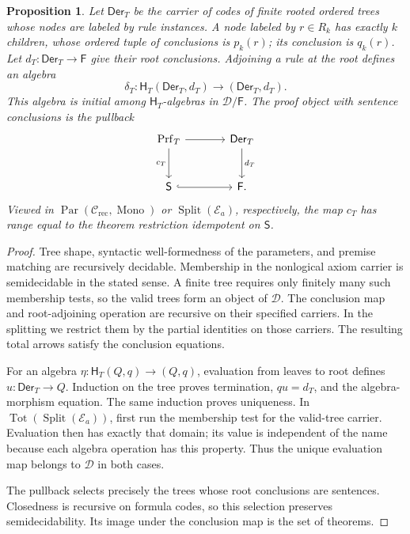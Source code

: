 \documentclass[11pt]{article}
\newtheorem{proposition}[theorem]{Proposition}
\begin{document}
\begin{proposition}\label{prop:first-order-proof-initial}
Let $\mathsf{Der}_T$ be the carrier of codes of finite rooted ordered
trees whose nodes are labeled by rule instances. A node labeled by
$r\in R_k$ has exactly $k$ children, whose ordered tuple of conclusions
is $p_k(r)$; its conclusion is $q_k(r)$. Let
$d_T:\mathsf{Der}_T\to\mathsf F$ give their root conclusions.
Adjoining a rule at the root defines an algebra
\[
 \delta_T:\mathsf H_T(\mathsf{Der}_T,d_T)
       \longrightarrow(\mathsf{Der}_T,d_T).
\]
This algebra is initial among $\mathsf H_T$-algebras in
$\mathcal D/\mathsf F$.
The proof object with sentence conclusions is the pullback
\[
\begin{tikzcd}[column sep=large,row sep=large]
 \mathrm{Prf}_T \arrow[r] \arrow[d,"c_T"'] &
 \mathsf{Der}_T \arrow[d,"d_T"] \\
 \mathsf S \arrow[r,hook] & \mathsf F.
\end{tikzcd}
\]
Viewed in $\operatorname{Par}(\mathcal C_{\mathrm{rec}},\operatorname{Mono})$
or $\operatorname{Split}(\mathcal E_a)$, respectively, the map $c_T$
has range equal to the theorem restriction idempotent on $\mathsf S$.
\end{proposition}
\begin{proof}
Tree shape, syntactic well-formedness of the parameters, and premise
matching are recursively decidable. Membership in the nonlogical
axiom carrier is semidecidable in the stated sense. A finite tree
requires only finitely many such membership tests, so the valid trees
form an object of $\mathcal D$.
The conclusion map and root-adjoining operation are recursive on their
specified carriers. In the splitting we restrict them by the partial
identities on those carriers. The resulting total arrows satisfy the
conclusion equations.

For an algebra $\eta:\mathsf H_T(Q,q)\to(Q,q)$, evaluation from
leaves to root defines $u:\mathsf{Der}_T\to Q$.
Induction on the tree proves termination, $qu=d_T$, and the
algebra-morphism equation. The same induction proves uniqueness. In
$\operatorname{Tot}(\operatorname{Split}(\mathcal E_a))$, first run the
membership test for the valid-tree carrier. Evaluation then has exactly
that domain; its value is independent of the name because each algebra
operation has this property. Thus the unique evaluation map belongs to
$\mathcal D$ in both cases.

The pullback selects precisely the trees whose root conclusions are
sentences. Closedness is recursive on formula codes, so this selection
preserves semidecidability. Its image under the conclusion map is the
set of theorems.
\end{proof}
\end{document}
